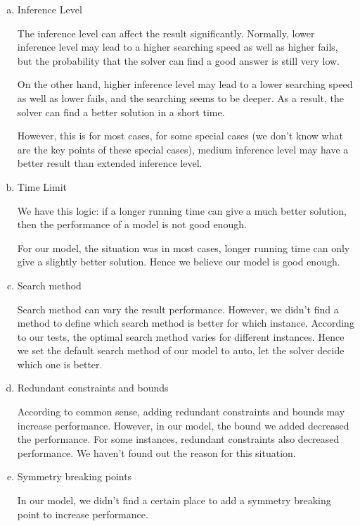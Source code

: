 \documentclass[a4paper, 12pt]{article}
\begin{document}
\begin{enumerate}[a.~]
\item Inference Level

The inference level can affect the result significantly. Normally, lower inference level may lead to a higher searching speed as well as higher fails, but the probability that the solver can find a good answer is still very low. 

On the other hand, higher inference level may lead to a lower searching speed as well as lower fails, and the searching seems to be deeper. As a result, the solver can find a better solution in a short time. 

However, this is for most cases, for some special cases (we don't know what are the key points of these special cases), medium inference level may have a better result than extended inference level. 

\item Time Limit

We have this logic: if a longer running time can give a much better solution, then the performance of a model is not good enough. 

For our model, the situation was in most cases, longer running time can only give a slightly better solution. Hence we believe our model is good enough. 

\item Search method

Search method can vary the result performance. However, we didn't find a method to define which search method is better for which instance. According to our tests, the optimal search method varies for different instances. Hence we set the default search method of our model to auto, let the solver decide which one is better. 

\item Redundant constraints and bounds

According to common sense, adding redundant constraints and bounds may increase performance. However, in our model, the bound we added decreased the performance. For some instances, redundant constraints also decreased performance. We haven't found out the reason for this situation. 

\item Symmetry breaking points

In our model, we didn't find a certain place to add a symmetry breaking point to increase performance. 
\end{enumerate}
\end{document}

